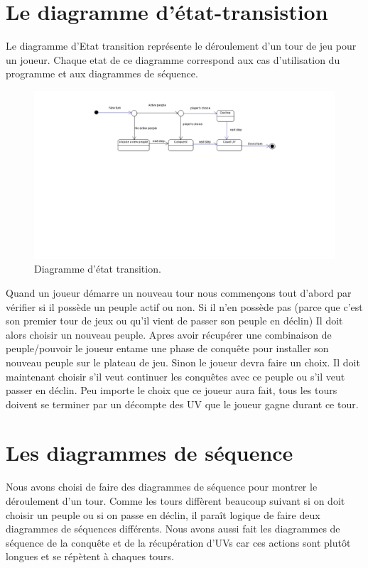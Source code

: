 \documentclass[11pt]{report}
\begin{document}
	\section{Le diagramme d'état-transistion}
	
	Le diagramme d'Etat transition représente le déroulement d'un tour de jeu pour un joueur.
Chaque etat de ce diagramme correspond aux cas d'utilisation du programme et aux diagrammes de séquence.

\begin{figure}[!h]
\centering
\includegraphics[width=13cm]{Tour.png}
\caption{Diagramme d'état transition.}
\end{figure}

Quand un joueur démarre un nouveau tour nous commençons tout d'abord par vérifier si il possède un peuple actif ou non.
Si il n'en possède pas (parce que c'est son premier tour de jeux ou qu'il vient de passer son peuple en déclin) Il doit alors choisir un nouveau peuple. Apres avoir récupérer une combinaison de peuple/pouvoir le joueur entame une phase de conquête pour installer son nouveau peuple sur le plateau de jeu.
Sinon le joueur devra faire un choix. Il doit maintenant choisir s'il veut continuer les conquêtes avec ce peuple ou s'il veut passer en déclin. 
Peu importe le choix que ce joueur aura fait, tous les tours doivent se terminer par un décompte des UV que le joueur gagne durant ce tour.

	\section{Les diagrammes de séquence}
	
	Nous avons choisi de faire des diagrammes de séquence pour montrer le déroulement d'un tour. Comme les tours diffèrent beaucoup suivant si on doit choisir un peuple ou si on passe en déclin, il paraît logique de faire deux diagrammes de séquences différents. Nous avons aussi fait les diagrammes de séquence de la conquête et de la récupération d'UVs car ces actions sont plutôt longues et se répètent à chaques tours.
\end{document}
